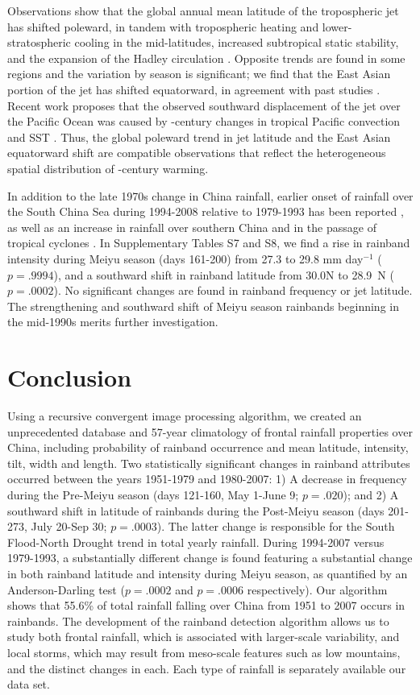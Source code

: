 	 Observations show that the global annual mean latitude of the tropospheric jet has shifted poleward, in tandem with tropospheric heating and lower-stratospheric cooling in the mid-latitudes, increased subtropical static stability, and the expansion of the Hadley circulation \citep{Fu2006,Archer2008,Fu2011}. Opposite trends are found in some regions and the variation by season is significant; we find that the East Asian portion of the jet has shifted equatorward, in agreement with past studies \citep{Yu2007, Archer2008}. Recent work proposes that the observed southward displacement of the jet over the Pacific Ocean was caused by -century changes in tropical Pacific convection and SST \citep{Park2014a}. Thus, the global poleward trend in jet latitude and the East Asian equatorward shift are compatible observations that reflect the heterogeneous spatial distribution of -century warming.
	 
	 In addition to the late 1970s change in China rainfall, earlier onset of rainfall over the South China Sea during 1994-2008 relative to 1979-1993 has been reported \citep{Kajikawa2012}, as well as an increase in rainfall over southern China and in the passage of tropical cyclones \citep{Kwon2007,Chang2014}. In Supplementary Tables S7 and S8, we find a rise in rainband intensity during Meiyu season (days 161-200) from 27.3 to 29.8 mm day$^{-1}$ ($p=.9994$), and a southward shift in rainband latitude from 30.0\textdegree N to 28.9\textdegree\ N ($p=.0002$). No significant changes are found in rainband frequency or jet latitude. The strengthening and southward shift of Meiyu season rainbands beginning in the mid-1990s merits further investigation.
	 				
\section{Conclusion}

	Using a recursive convergent image processing algorithm, we created an unprecedented database and 57-year climatology of frontal rainfall properties over China, including probability of rainband occurrence and mean latitude, intensity, tilt, width and length. Two statistically significant changes in rainband attributes occurred between the years 1951-1979 and 1980-2007: 1) A decrease in frequency during the Pre-Meiyu season (days 121-160, May 1-June 9; $p=.020$); and 2) A southward shift in latitude of rainbands during the Post-Meiyu season (days 201-273, July 20-Sep 30; $p=.0003$). The latter change is responsible for the South Flood-North Drought trend in total yearly rainfall. During 1994-2007 versus 1979-1993, a substantially different change is found featuring a substantial change in both rainband latitude and intensity during Meiyu season, as quantified by an Anderson-Darling test ($p=.0002$ and $p=.0006$ respectively). Our algorithm shows that 55.6\% of total rainfall falling over China from 1951 to 2007 occurs in rainbands. The development of the rainband detection algorithm allows us to study both frontal rainfall, which is associated with larger-scale variability, and local storms, which may result from meso-scale features such as low mountains, and the distinct changes in each. Each type of rainfall is separately available our data set.
	 
